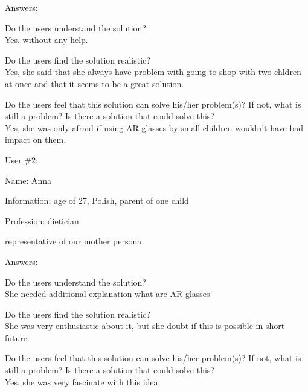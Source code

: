 \documentclass[a4paper,10pt,oneside]{scrreprt}
\begin{document}
Answers:
\begin{compactitem}
	\item Do the users understand the solution?\\
	Yes, without any help.
	
	\item Do the users find the solution realistic?\\
	Yes, she said that she always have problem with going to shop with two chldren at once and that it seems to be a great solution.
	
	\item Do the users feel that this solution can solve his/her problem(s)? If not, what is still
	a problem? Is there a solution that could solve this?\\
	Yes, she was only afraid if using AR glasses by small children wouldn't have bad impact on them.

\end{compactitem}
\bigskip

User \#2:
\begin{compactitem}
	\item Name: Anna
	\item Information: age of 27, Polish, parent of one child
	\item Profession: dietician
	\item representative of our mother persona 
\end{compactitem}
\bigskip

Answers:
\begin{compactitem}
	\item Do the users understand the solution?\\
	She needed additional explanation what are AR glasses\\
	
	\item Do the users find the solution realistic?\\
	She was very enthusiastic about it, but she doubt if this is possible in short future.\\
	
	\item Do the users feel that this solution can solve his/her problem(s)? If not, what is still
	a problem? Is there a solution that could solve this?\\
	Yes, she was very fascinate with this idea.\\
\end{compactitem}
\bigskip
\end{document}
